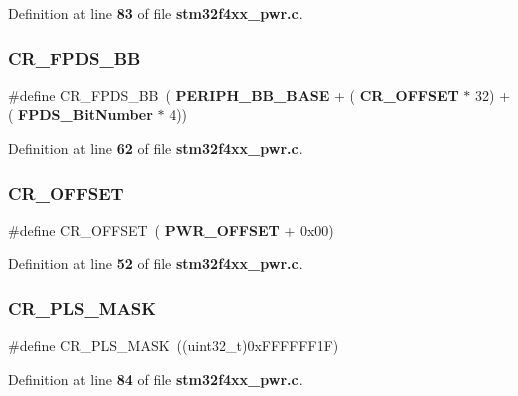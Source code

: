 Definition at line \textbf{ 83} of file \textbf{ stm32f4xx\+\_\+pwr.\+c}.

\mbox{\label{group__PWR_ga57d7041b5d1bf0ec94fa18152a7fa208}} 
\subsubsection{C\+R\+\_\+\+F\+P\+D\+S\+\_\+\+BB}
{\footnotesize\ttfamily \#define C\+R\+\_\+\+F\+P\+D\+S\+\_\+\+BB~(\textbf{ P\+E\+R\+I\+P\+H\+\_\+\+B\+B\+\_\+\+B\+A\+SE} + (\textbf{ C\+R\+\_\+\+O\+F\+F\+S\+ET} $\ast$ 32) + (\textbf{ F\+P\+D\+S\+\_\+\+Bit\+Number} $\ast$ 4))}



Definition at line \textbf{ 62} of file \textbf{ stm32f4xx\+\_\+pwr.\+c}.

\mbox{\label{group__PWR_gafa1d3d0ea72132df651c76fc1bdffffc}} 
\subsubsection{C\+R\+\_\+\+O\+F\+F\+S\+ET}
{\footnotesize\ttfamily \#define C\+R\+\_\+\+O\+F\+F\+S\+ET~(\textbf{ P\+W\+R\+\_\+\+O\+F\+F\+S\+ET} + 0x00)}



Definition at line \textbf{ 52} of file \textbf{ stm32f4xx\+\_\+pwr.\+c}.

\mbox{\label{group__PWR_gac4a30eebdd1d292331a578b189962e77}} 
\subsubsection{C\+R\+\_\+\+P\+L\+S\+\_\+\+M\+A\+SK}
{\footnotesize\ttfamily \#define C\+R\+\_\+\+P\+L\+S\+\_\+\+M\+A\+SK~((uint32\+\_\+t)0x\+F\+F\+F\+F\+F\+F1\+F)}



Definition at line \textbf{ 84} of file \textbf{ stm32f4xx\+\_\+pwr.\+c}.

\mbox{\label{group__PWR_ga2e7c040f5c63f0fce3e274d9a03f1d1a}} 
